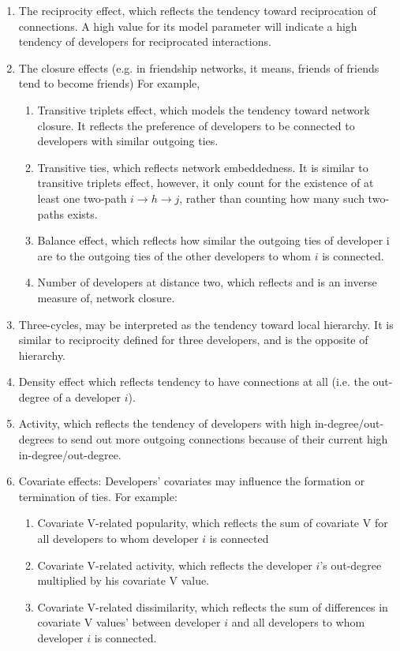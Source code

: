 \documentclass[12pt,letterpaper]{gthesis2}  %
\begin{document}
\begin{enumerate}
\item{The reciprocity effect, which reflects the tendency toward reciprocation of connections. A high value for its model parameter will indicate a high tendency of developers for reciprocated interactions.}
\item{The closure effects (e.g. in friendship networks, it means, friends of friends tend to become friends)}
For example, 
\begin{enumerate}
\item Transitive triplets effect, which models the tendency toward network closure. It reflects the preference of developers to be connected to developers with similar outgoing ties.  
\item Transitive ties, which reflects network embeddedness. It is similar to transitive triplets effect, however, it only count for the existence of at least one two-path  $i \rightarrow h \rightarrow j$, rather than counting how many such two-paths exists.  
\item Balance effect, which reflects how similar the outgoing ties of developer i are to the outgoing ties of the other developers to whom $i$ is connected. 
\item Number of developers at distance two, which reflects and is an inverse measure of, network closure. 
\end{enumerate}
\item{Three-cycles, may be interpreted as the tendency toward local hierarchy. It is similar to reciprocity defined for three developers, and is the opposite of hierarchy.}
\item{Density effect which reflects tendency to have connections at all (i.e. the out-degree of a developer $i$).}
\item{Activity, which reflects the tendency of developers with high in-degree/out-degrees to send out more outgoing connections because of their current high in-degree/out-degree.}
\item Covariate effects: Developers' covariates may influence the formation or termination of ties. For example:
\begin{enumerate}
\item{Covariate V-related popularity, which reflects the sum of covariate V for all developers to whom developer $i$ is connected}
\item{Covariate V-related activity, which reflects the developer $i$'s out-degree multiplied by his covariate V value.}
\item{Covariate V-related dissimilarity, which reflects the sum of differences in covariate V values' between developer $i$ and all developers to whom developer $i$ is connected.}
\end{enumerate}


\end{enumerate}
\end{document}
